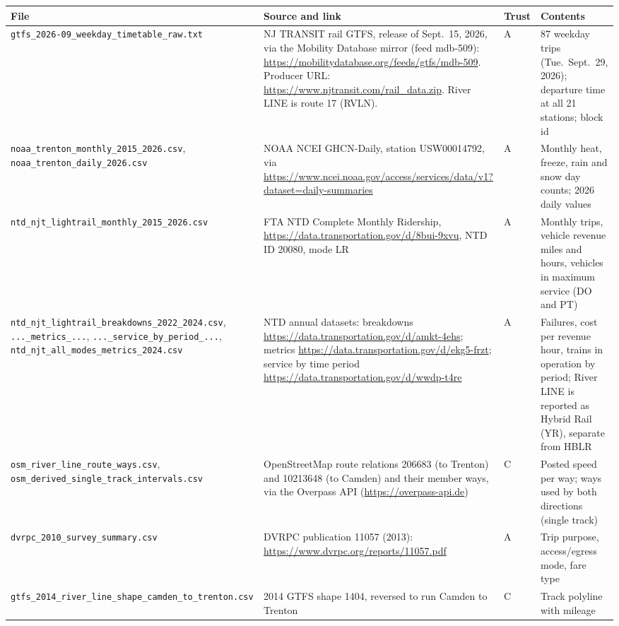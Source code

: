 \documentclass[11pt]{article}
\begin{document}
\begin{longtable}{@{}p{3.6cm}p{7.2cm}p{1.0cm}p{2.3cm}@{}}
\toprule
File & Source and link & Trust & Contents \\
\midrule\endhead
\nolinkurl{gtfs_2026-09_weekday_timetable_raw.txt} &
NJ TRANSIT rail GTFS, release of Sept.~15, 2026, via the Mobility Database mirror (feed mdb-509): \url{https://mobilitydatabase.org/feeds/gtfs/mdb-509}. Producer URL: \url{https://www.njtransit.com/rail_data.zip}. River LINE is route 17 (RVLN). &
A & 87 weekday trips (Tue.~Sept.~29, 2026); departure time at all 21 stations; block id \\
\nolinkurl{noaa_trenton_monthly_2015_2026.csv}, \nolinkurl{noaa_trenton_daily_2026.csv} &
NOAA NCEI GHCN-Daily, station USW00014792, via \url{https://www.ncei.noaa.gov/access/services/data/v1?dataset=daily-summaries} &
A & Monthly heat, freeze, rain and snow day counts; 2026 daily values \\
\nolinkurl{ntd_njt_lightrail_monthly_2015_2026.csv} &
FTA NTD Complete Monthly Ridership, \url{https://data.transportation.gov/d/8bui-9xvu}, NTD ID 20080, mode LR &
A & Monthly trips, vehicle revenue miles and hours, vehicles in maximum service (DO and PT) \\
\nolinkurl{ntd_njt_lightrail_breakdowns_2022_2024.csv}, \nolinkurl{..._metrics_...}, \nolinkurl{..._service_by_period_...}, \nolinkurl{ntd_njt_all_modes_metrics_2024.csv} &
NTD annual datasets: breakdowns \url{https://data.transportation.gov/d/amkt-4ehs}; metrics \url{https://data.transportation.gov/d/ekg5-frzt}; service by time period \url{https://data.transportation.gov/d/wwdp-t4re} &
A & Failures, cost per revenue hour, trains in operation by period; River LINE is reported as Hybrid Rail (YR), separate from HBLR \\
\nolinkurl{osm_river_line_route_ways.csv}, \nolinkurl{osm_derived_single_track_intervals.csv} &
OpenStreetMap route relations 206683 (to Trenton) and 10213648 (to Camden) and their member ways, via the Overpass API (\url{https://overpass-api.de}) &
C & Posted speed per way; ways used by both directions (single track) \\
\nolinkurl{dvrpc_2010_survey_summary.csv} &
DVRPC publication 11057 (2013): \url{https://www.dvrpc.org/reports/11057.pdf} &
A & Trip purpose, access/egress mode, fare type \\
\nolinkurl{gtfs_2014_river_line_shape_camden_to_trenton.csv} &
2014 GTFS shape 1404, reversed to run Camden to Trenton &
C & Track polyline with mileage \\
\bottomrule
\end{longtable}
\end{document}
